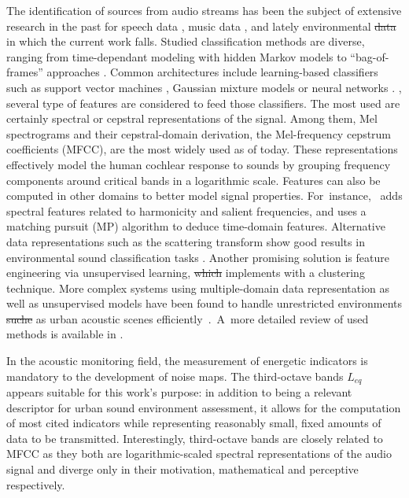 \documentclass[sensors,article,accept,moreauthors,pdftex,10pt,a4paper]{mdpi}
\providecommand{\DIFaddtex}[1]{{\protect\color{blue}\uwave{#1}}} %
\providecommand{\DIFdeltex}[1]{{\protect\color{red}\sout{#1}}}                      %
\providecommand{\DIFaddbegin}{} %
\providecommand{\DIFaddend}{} %
\providecommand{\DIFdelbegin}{} %
\providecommand{\DIFdelend}{} %
\providecommand{\DIFadd}[1]{\texorpdfstring{\DIFaddtex{#1}}{#1}} %
\providecommand{\DIFdel}[1]{\texorpdfstring{\DIFdeltex{#1}}{}} %
\begin{document}
The identification of sources from audio streams has been the subject of extensive research in the past for speech data \cite{anusuya2009}, music data \cite{tzanetakis2002}, and lately environmental \DIFdelbegin \DIFdel{data }\DIFdelend \DIFaddbegin {\DIFadd{data,}} \DIFaddend in which the current work falls. Studied classification methods are diverse, ranging from time-dependant modeling with hidden Markov models \cite{ntalampiras2014} to ``bag-of-frames'' approaches \cite{aucouturier2007, foggia2015}. Common architectures include learning-based classifiers such as support vector machines \cite{kumar2016}, Gaussian mixture models \cite{radhakrishnan2005} or neural networks \cite{salamon2017, piczak2015}. \DIFdelbegin %
\DIFdelend \DIFaddbegin {\DIFadd{In addition}}\DIFaddend , several type of features are considered to feed those classifiers. The most used are certainly spectral \cite{khunarsal2013} or cepstral \cite{couvreur2004} representations of the signal. Among them, Mel spectrograms and their cepstral-domain derivation, the Mel-frequency cepstrum coefficients (MFCC), are the most widely used as of today. These representations effectively model the human cochlear response to sounds by grouping frequency components around critical bands in a logarithmic scale. Features can also be computed in other domains to better model signal properties. \mbox{For \DIFaddbegin {\DIFaddend instance,\DIFaddbegin } {\DIFadd{Cai et al.}} \DIFaddend \cite{cai2006}} adds spectral features related to harmonicity and salient frequencies, and \cite{chu2009} uses a matching pursuit (MP) algorithm to deduce time-domain features. Alternative data representations such as the scattering transform \cite{bauge2013} show good results in environmental sound classification tasks \cite{salamon2015}. Another promising solution is feature engineering via unsupervised learning, \DIFdelbegin \DIFdel{which }\DIFdelend \DIFaddbegin {\DIFadd{which}} {\DIFadd{Salamon et al.}} \DIFaddend \cite{salamon2015-2} implements with a clustering technique. More complex systems using multiple-domain data representation as well as unsupervised models have been found to handle unrestricted environments \DIFdelbegin \DIFdel{suche }\DIFdelend \DIFaddbegin \DIFadd{such }\DIFaddend as urban acoustic scenes \mbox{efficiently \citep{ntalampiras2012}. }A~more detailed review of used methods is available in \cite{chachada2013}.

In the acoustic monitoring field, the measurement of energetic indicators is mandatory to the development of noise maps. The third-octave bands $L_{eq}$ appears suitable for this work's purpose: in addition to being a relevant descriptor \cite{torija2013} for urban sound environment assessment, it allows for the computation of most cited indicators while representing reasonably small, fixed amounts of data to be transmitted. Interestingly, third-octave bands are closely related to MFCC as they both are logarithmic-scaled spectral representations of the audio signal and diverge only in their motivation, mathematical and perceptive respectively.
\end{document}
